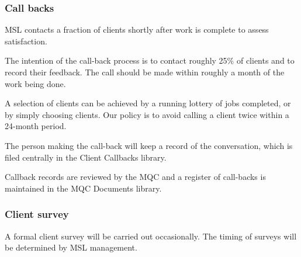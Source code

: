 \subsubsection{Call backs}
MSL contacts a fraction of clients shortly after work is complete to assess satisfaction.

The intention of the call-back process is to contact roughly 25\% of clients and to record their feedback. The call should be made within roughly a month of the work being done.

A selection of clients can be achieved by a running lottery of jobs completed, or by simply choosing clients. Our policy is to avoid calling a client twice within a 24-month period.

The person making the call-back will keep a record of the conversation, which is filed centrally in the Client Callbacks library. 

Callback records are reviewed by the MQC and a register of call-backs is maintained in the MQC Documents library.
  
\subsubsection{Client survey}
A formal client survey will be carried out occasionally. The timing of surveys will be determined by MSL management.